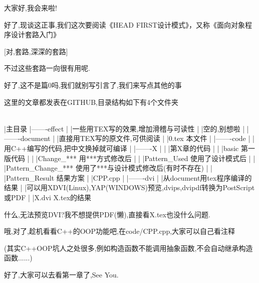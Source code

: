 大家好,我会来啦!

好了,现谈这正事,我们这次要阅读《HEAD FIRST设计模式》，又称《面向对象程序设计套路入门》

[对,套路,深深的套路]

不过这些套路一向很有用呢.

好了,这不是篇0吗,我们就别写引言了,我们来写点其他的事

这里的文章都发表在GITHUB,目录结构如下有4个文件夹

\\
|主目录
|-------effect
|       |一些用TEX写的效果,增加滑稽与可读性
|       |空的,别想啦
|
|-------document
|       |直接用TEX写的原文件,可供阅读
|       |0.tex 本文件
|
|-------code
|       |用C++编写的代码,把中文换掉就可编译
|       |-------X
|       |       |第X章的代码
|       |       |basic 第一版代码
|       |       |Change\_*** 用***方式修改后
|       |       |Pattern\_Used 使用了设计模式后
|       |       |Pattern\_Change\_*** 使用了***与设计模式修改后(有时不存在)
|       |       |Pattern\_Result 结果方案
|       |CPP.cpp
|
|-------dvi
|       |从document用tex程序编译的结果
|       |可以用XDVI(Linux),YAP(WINDOWS)预览,dvips,dvipdf转换为PostScript或PDF
|       |X.dvi X.tex的结果

什么,无法预览DVI?我不想提供PDF(懒),直接看X.tex也没什么问题.

哦,对了,趁机看看C++的OOP功能吧,在code/CPP.cpp,大家可以自己看注释

(其实C++OOP坑人之处很多,例如构造函数不能调用抽象函数,不会自动继承构造函数......)

好了,大家可以去看第一章了,See You.
